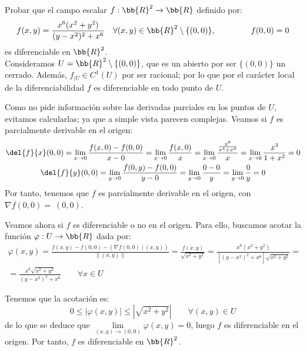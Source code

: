 \begin{ejercicio}
    Probar que el campo escalar $f:\bb{R}^2\to \bb{R}$ definido por:
    \begin{equation*}
        f(x,y)=\frac{x^6(x^2+y^2)}{(y-x^2)^2+x^6} \quad \forall (x,y)\in \bb{R}^2\setminus \{(0,0)\},\hspace{1.5cm} f(0,0)=0
    \end{equation*}
    es diferenciable en $\bb{R}^2$.\\

    Consideramos $U=\bb{R}^2\setminus \{(0,0)\}$, que es un abierto por ser $\{(0,0)\}$ un cerrado. Además, $f_{\big| U}\in C^1({U})$ por ser racional; por lo que por el carácter local de la diferenciabilidad $f$ es diferenciable en todo punto de $U$.

    Como no pide información sobre las derivadas parciales en los puntos de $U$, evitamos calcularlas; ya que a simple vista parecen complejas. Veamos si $f$ es parcialmente derivable en el origen:
    \begin{gather*}
        \del{f}{x}(0,0) = \lim_{x\to 0}\frac{f(x,0)-f(0,0)}{x-0} = \lim_{x\to 0}\frac{f(x,0)}{x} = \lim_{x\to 0}\frac{\frac{x^8}{x^4 + x^6}}{x}
        = \lim_{x\to 0}\frac{x^3}{1 + x^2}= 0 \\
        \del{f}{y}(0,0) = \lim_{y\to 0}\frac{f(0,y)-f(0,0)}{y-0} = \lim_{y\to 0}\frac{0-0}{y} = \lim_{y\to 0}\frac{0}{y} = 0
    \end{gather*}
    Por tanto, tenemos que $f$ es parcialmente derivable en el origen, con $\nabla f(0,0)=~(0,0)$.

    Veamos ahora si $f$ es diferenciable o no en el origen. Para ello, buscamos acotar la función $\varphi:U\to \bb{R}$ dada por:
    \begin{multline*}
        \varphi(x,y) = \frac{f(x,y)-f(0,0) - (\nabla f(0,0)\mid (x,y))}{\|(x,y)\|}
        = \frac{f(x,y)}{\sqrt{x^2+y^2}}
        = \frac{x^6(x^2+y^2)}{[(y-x^2)^2+x^6]\sqrt{x^2+y^2}} =\\
        = \frac{x^6\sqrt{x^2+y^2}}{(y-x^2)^2+x^6} \qquad \forall x\in U
    \end{multline*}

    Tenemos que la acotación es:
    \begin{equation*}
        0\leq |\varphi(x,y)| \leq |\sqrt{x^2+y^2}| \qquad \forall (x,y)\in U
    \end{equation*}
    de lo que se deduce que $\lim\limits_{(x,y)\to (0,0)} \varphi(x,y) = 0$, luego $f$ es diferenciable en el origen. Por tanto, $f$ es diferenciable en $\bb{R}^2$.
\end{ejercicio}


